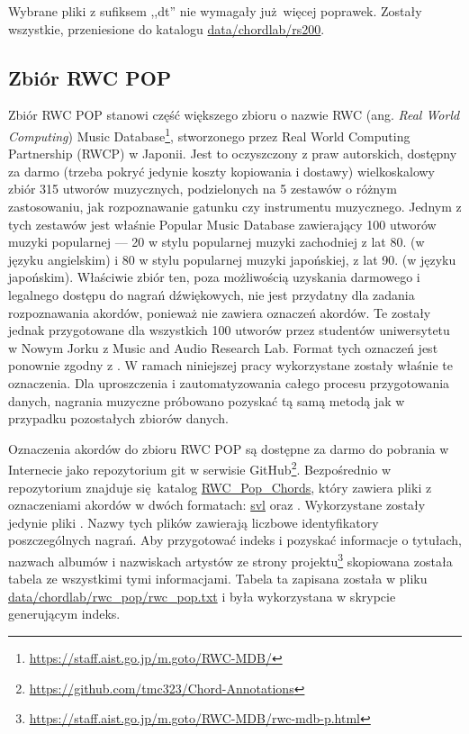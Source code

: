 Wybrane pliki z sufiksem ,,dt'' nie wymagały już więcej poprawek. Zostały wszystkie, przeniesione do katalogu \url{data/chordlab/rs200}.

\subsection{Zbiór RWC POP}

Zbiór RWC POP \cite{goto_rwc_nodate} stanowi część większego zbioru o nazwie RWC (ang. \emph{Real World Computing}) Music Database\footnote{\url{https://staff.aist.go.jp/m.goto/RWC-MDB/}}, stworzonego przez Real World Computing Partnership (RWCP) w Japonii. Jest to oczyszczony z praw autorskich, dostępny za darmo (trzeba pokryć jedynie koszty kopiowania i dostawy) wielkoskalowy zbiór 315 utworów muzycznych, podzielonych na 5 zestawów o różnym zastosowaniu, jak rozpoznawanie gatunku czy instrumentu muzycznego. Jednym z tych zestawów jest właśnie Popular Music Database zawierający 100 utworów muzyki popularnej --- 20 w stylu popularnej muzyki zachodniej z lat 80. (w języku angielskim) i 80 w stylu popularnej muzyki japońskiej, z lat 90. (w języku japońskim). Właściwie zbiór ten, poza możliwością uzyskania darmowego i legalnego dostępu do nagrań dźwiękowych, nie jest przydatny dla zadania rozpoznawania akordów, ponieważ nie zawiera oznaczeń akordów. Te zostały jednak przygotowane dla wszystkich 100 utworów przez studentów uniwersytetu w Nowym Jorku z Music and Audio Research Lab. Format tych oznaczeń jest ponownie zgodny z \cite{harte_towards_nodate}. W ramach niniejszej pracy wykorzystane zostały właśnie te oznaczenia.  Dla uproszczenia i zautomatyzowania całego procesu przygotowania danych, nagrania muzyczne próbowano pozyskać tą samą metodą jak w przypadku pozostałych zbiorów danych.

Oznaczenia akordów do zbioru RWC POP są dostępne za darmo do pobrania w Internecie jako repozytorium git w serwisie GitHub\footnote{\url{https://github.com/tmc323/Chord-Annotations}}. Bezpośrednio w repozytorium znajduje się katalog \url{RWC_Pop_Chords}, który zawiera pliki z oznaczeniami akordów w dwóch formatach: \url{svl} oraz . Wykorzystane zostały jedynie pliki . Nazwy tych plików zawierają liczbowe identyfikatory poszczególnych nagrań. Aby przygotować indeks i pozyskać informacje o tytułach, nazwach albumów i nazwiskach artystów ze strony projektu\footnote{\url{https://staff.aist.go.jp/m.goto/RWC-MDB/rwc-mdb-p.html}} skopiowana została tabela ze wszystkimi tymi informacjami. Tabela ta zapisana została w pliku \url{data/chordlab/rwc_pop/rwc_pop.txt} i była wykorzystana w skrypcie generującym indeks.

